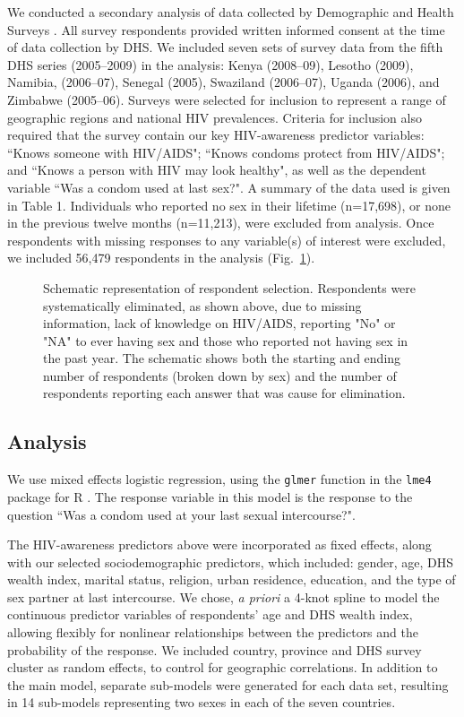 \documentclass[10pt,letterpaper]{article}
\newcommand{\fref}[1]{Fig.~\ref{#1.fig}}
\newcommand{\KnowsPWHA}{``Knows someone with HIV/AIDS"}
\newcommand{\KnowsCP}{``Knows condoms protect from HIV/AIDS"}
\newcommand{\KnowsHealthy}{``Knows a person with HIV may look healthy"}
\begin{document}
We conducted a secondary analysis of data collected by Demographic and Health Surveys \cite{DHS}. All survey respondents provided written informed consent at the time of data collection by DHS.
We included seven sets of survey data from the fifth DHS series (2005--2009) in the analysis: Kenya (2008--09), Lesotho (2009), Namibia, (2006--07), Senegal (2005), Swaziland (2006--07), Uganda (2006), and Zimbabwe (2005--06). Surveys were selected for inclusion to represent a range of geographic regions and national HIV prevalences.  Criteria for inclusion also required that the survey contain  our key HIV-awareness predictor variables: \KnowsPWHA; \KnowsCP; and \KnowsHealthy, as well as the dependent variable ``Was a condom used at last sex?".  A summary of the data used is given in Table 1. Individuals who reported no sex in their lifetime (n=17,698), or none in the previous twelve months (n=11,213), were excluded from analysis. Once respondents with missing responses to any variable(s) of interest were excluded, we included 56,479 respondents in the analysis (\fref{flowchart}).


\begin{figure}[!hbt]
\caption{Schematic representation of respondent selection. Respondents were systematically eliminated, as shown above, due to missing information, lack of knowledge on HIV/AIDS,  reporting "No" or "NA" to ever having sex and those who reported not having sex in the past year. The schematic shows both the starting and ending number of respondents (broken down by sex) and the number of respondents reporting each answer that was cause for elimination.}
\label{flowchart.fig}
\end{figure}

\subsection{Analysis}

We use mixed effects logistic regression, using the {\tt glmer} function in the {\tt lme4} package for R \cite{Rstats,Rpackage_lme4}. The response variable in this model is the response to the question ``Was a condom used at your last sexual intercourse?". 

The HIV-awareness predictors above were incorporated as fixed effects, along with our selected sociodemographic predictors, which included: gender, age, DHS wealth index, marital status, religion, urban residence, education, and the type of sex partner at last intercourse. We chose, \emph{a priori} a 4-knot spline to model the continuous predictor variables of respondents' age and DHS wealth index, allowing flexibly for nonlinear relationships between the predictors and the probability of the response.  We included country, province and DHS survey cluster as random effects, to control for geographic correlations. In addition to the main model, separate sub-models were generated for each data set, resulting in 14 sub-models representing two sexes in each of the seven countries.
\end{document}
